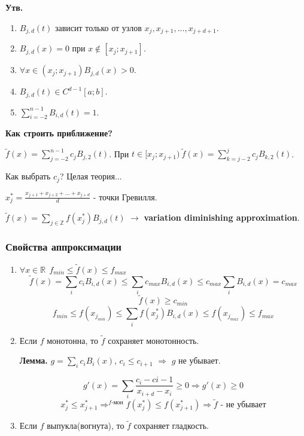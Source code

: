 \textbf{Утв.}
\begin{enumerate}
    \item $B_{j,d}(t)$ зависит только от узлов $ x_j, x_{j+1}, ..., x_{j+d+1} $.
    \item $ B_{j,d}(x) = 0 $ при $ x \notin [x_j; x_{j+1}] $.
    \item $ \forall x \in (x_j; x_{j+1}) B_{j,d}(x) > 0 $.
    \item $ B_{j,d}(t) \in C^{d-1}[a; b] $.
    \item $ \sum_{i=-2}^{n-1} B_{i,d}(t) = 1 $.
\end{enumerate}

\textbf{Как строить приближение?}

$ \tilde{f}(x) = \sum_{j=-2}^{n-1} c_j B_{j,2}(t) $.
При $ t \in [x_j; x_{j+1})\ \tilde{f}(x) = \sum_{k=j-2}^{j} c_j B_{k,2}(t) $.

Как выбрать $c_j$? Целая теория...

$ x^*_j = \frac{x_{j+1} + x_{j+2} + ... + x_{j+d}}{d} $ - точки Гревилля.

$ \tilde{f}(x) = \sum_{j \in \mathbb{Z}} f(x^*_j) B_{j,d}(t) $ $\to$ \textbf{variation diminishing approximation}.

\subsubsection{Свойства аппроксимации}

\begin{enumerate}
    \item 
        $\forall x \in \mathbb{R}\ \ f_{min} \leq \tilde{f}(x) \leq f_{max}$
        \begin{equation}
            \tilde{f}(x) = \sum_i c_i B_{i,d}(x) \leq \sum_i c_{max} B_{i,d}(x) \leq c_{max} \sum_i B_{i,d}(x) = c_{max}
        \end{equation}
        \begin{equation}
            \tilde{f}(x) \geq c_{min}
        \end{equation}
        \begin{equation}
            f_{min} \leq f(x_{j_{min}}) \leq \sum_i f(x^*_j) B_{i,d}(x) \leq f(x_{j_{max}}) \leq f_{max}
        \end{equation}
    \item
        Если $f$ монотонна, то $\tilde{f}$ сохраняет монотонность.
        
        \textbf{Лемма.} 
        $ g = \sum_{i} c_i B_i(x) $, $ c_i \leq c_{i+1} $ $\Rightarrow$ $g$ не убывает.

        \begin{equation}
            g'(x) = \sum_{i} \frac{c_i - c{i-1}}{x_{i+d} - x_{i}} \geq 0 \Rightarrow g'(x) \geq 0
        \end{equation}
        \begin{equation}
            x^*_j \leq x^*_{j+1} \Rightarrow^{f \text{-мон}} f(x^*_j) \leq f(x^*_{j+1}) \Rightarrow \tilde{f} \text{ - не убывает}
        \end{equation}
    \item
        Если $f$ выпукла(вогнута), то $\tilde{f}$ сохраняет гладкость.
\end{enumerate}

